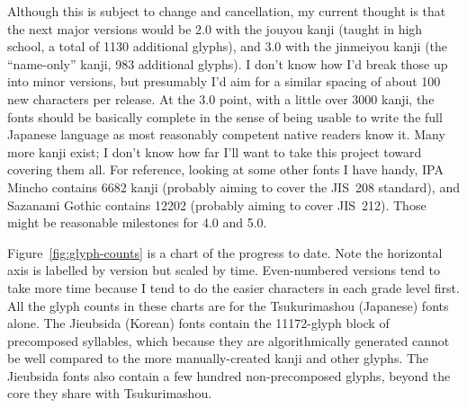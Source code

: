 \documentclass[14pt]{extarticle}
\begin{document}
Although this is subject to change and cancellation, my current thought is
that the next major versions would be 2.0 with the jouyou kanji (taught in
high school, a total of 1130 additional glyphs), and 3.0 with the jinmeiyou
kanji (the ``name-only'' kanji, 983 additional glyphs).  I don't know how
I'd break those up into minor versions, but presumably I'd aim for a similar
spacing of about 100 new characters per release.  At the 3.0 point, with a
little over 3000 kanji, the fonts should be basically complete in the sense
of being usable to write the full Japanese language as most reasonably
competent native readers know it.  Many more kanji exist; I don't know how
far I'll want to take this project toward covering them all.  For reference,
looking at some other fonts I have handy, IPA Mincho contains 6682 kanji
(probably aiming to cover the JIS~208 standard), and Sazanami Gothic
contains 12202 (probably aiming to cover JIS~212).  Those might be
reasonable milestones for 4.0 and 5.0.

Figure~\ref{fig:glyph-counts} is a chart of the progress to date.  Note the
horizontal axis is labelled by version but scaled by time.  Even-numbered
versions tend to take more time because I tend to do the easier characters
in each grade level first.  All the glyph counts in these charts are for the
Tsukurimashou (Japanese) fonts alone.  The Jieubsida (Korean) fonts contain
the 11172-glyph block of precomposed syllables, which because they are
algorithmically generated cannot be well compared to the more
manually-created kanji and other glyphs.  The Jieubsida fonts also contain a
few hundred non-precomposed glyphs, beyond the core they share with
Tsukurimashou.


\end{document}
